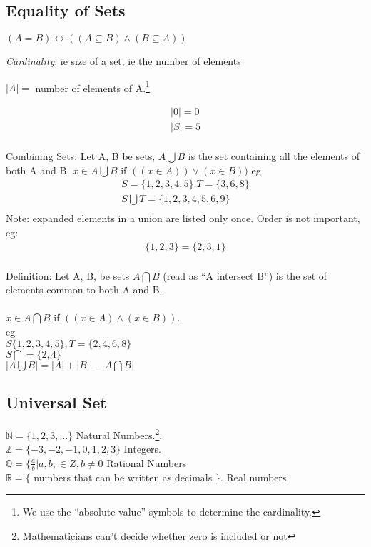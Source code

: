 \subsection{Equality of Sets}
\label{sec:EqualityOfSets}
$(A = B) \leftrightarrow (( A \subseteq B) \land (B \subseteq A))$

\emph{Cardinality}: ie size of a set, ie the number of elements

$|A| = $ number of elements of A.\footnote{We use the ``absolute value'' symbols
to determine the cardinality.}

\begin{align}
 |0| = 0 \\
 |S| = 5 \\
\end{align}

Combining Sets:
Let A, B be sets, $A \bigcup B$ is the set containing all the elements of both A and B.
  $x \in A \bigcup B$ if $(( x \in A )) \lor (x \in B))$
eg
\begin{align}
  S = \{ 1,2,3,4,5 \}. T = \{3, 6, 8\} \\
  S \bigcup T = \{1,2,3,4,5,6,9\} \\
\end{align}
Note: expanded elements in a union are listed only once. Order is not important, eg:
\begin{align}
  \{1,2,3\} = \{2, 3, 1\} \\
\end{align}

Definition: Let A, B, be sets $A \bigcap B$ (read as ``A intersect B'') is the set
of elements common to both A and B.\\
\\
$x \in A \bigcap B$ if $(( x \in A) \land (x \in B))$. \\
eg \\
$ S \{1,2,3,4,5\}, T = \{2, 4, 6, 8\}$ \\
$ S \bigcap = \{2, 4\} $ \\

$|A \bigcup B | = |A| + |B| - |A \bigcap B|$ \\

\subsection{Universal Set}

$\mathbb{N} = \{ 1, 2, 3, \ldots\} $ Natural Numbers.\footnote{Mathematicians can't decide whether zero is included or not}. \\
$\mathbb{Z} = \{ -3, -2, -1, 0, 1, 2, 3 \} $ Integers. \\
$\mathbb{Q} = \{ \frac{a}{b} | a, b, \in Z, b \neq 0$ Rational Numbers \\
$\mathbb{R} = \{$ numbers that can be written as decimals $\}$. Real numbers. \\

